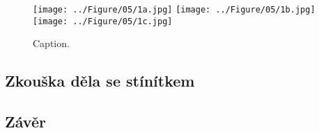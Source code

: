 \begin{figure}[htbp!]
\centering
\texttt{[image: ../Figure/05/1a.jpg]}
\vfill
\vfill
\texttt{[image: ../Figure/05/1b.jpg]}
\vfill
\vfill
\texttt{[image: ../Figure/05/1c.jpg]}
\caption{Caption.}
\label{05simulaceFinalniKonfigurace}
\end{figure}

\subsection{Zkouška děla se stínítkem}

\subsection{Závěr}

